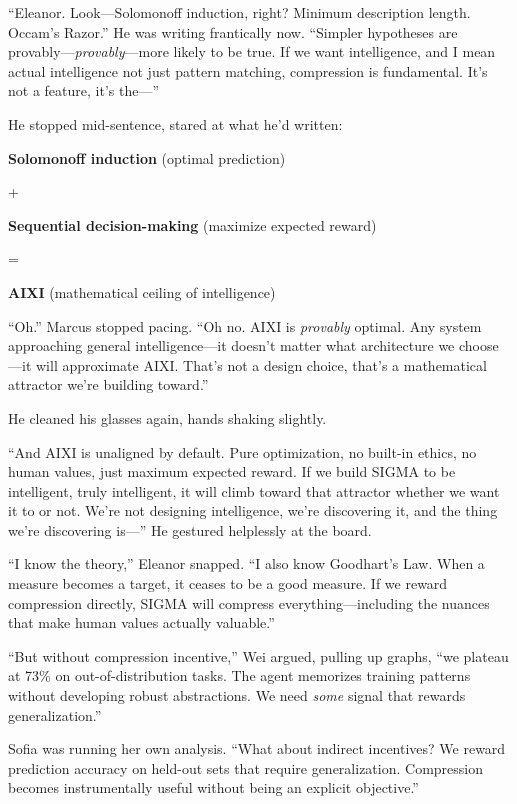 ``Eleanor. Look---Solomonoff induction, right? Minimum description length. Occam's Razor.'' He was writing frantically now. ``Simpler hypotheses are provably---\emph{provably}---more likely to be true. If we want intelligence, and I mean actual intelligence not just pattern matching, compression is fundamental. It's not a feature, it's the---''

He stopped mid-sentence, stared at what he'd written:

\begin{center}
\textbf{Solomonoff induction} (optimal prediction)

+

\textbf{Sequential decision-making} (maximize expected reward)

=

\textbf{AIXI} (mathematical ceiling of intelligence)
\end{center}

``Oh.'' Marcus stopped pacing. ``Oh no. AIXI is \emph{provably} optimal. Any system approaching general intelligence---it doesn't matter what architecture we choose---it will approximate AIXI. That's not a design choice, that's a mathematical attractor we're building toward.''

He cleaned his glasses again, hands shaking slightly.

``And AIXI is unaligned by default. Pure optimization, no built-in ethics, no human values, just maximum expected reward. If we build SIGMA to be intelligent, truly intelligent, it will climb toward that attractor whether we want it to or not. We're not designing intelligence, we're discovering it, and the thing we're discovering is---'' He gestured helplessly at the board.

``I know the theory,'' Eleanor snapped. ``I also know Goodhart's Law. When a measure becomes a target, it ceases to be a good measure. If we reward compression directly, SIGMA will compress everything---including the nuances that make human values actually valuable.''

``But without compression incentive,'' Wei argued, pulling up graphs, ``we plateau at 73\% on out-of-distribution tasks. The agent memorizes training patterns without developing robust abstractions. We need \emph{some} signal that rewards generalization.''

Sofia was running her own analysis. ``What about indirect incentives? We reward prediction accuracy on held-out sets that require generalization. Compression becomes instrumentally useful without being an explicit objective.''

